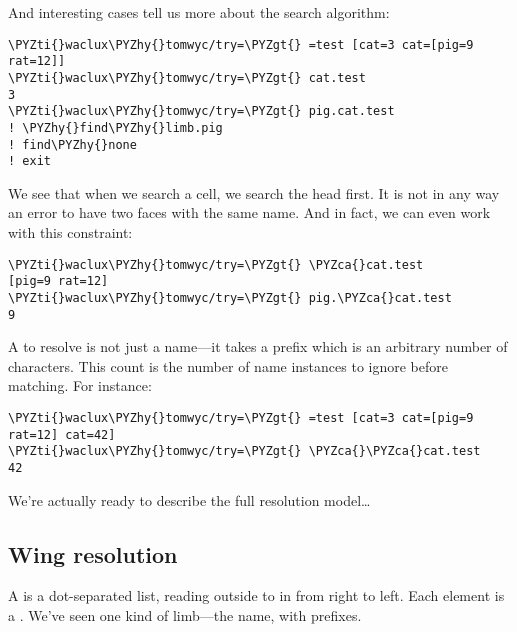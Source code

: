 And interesting cases tell us more about the search algorithm:

\begin{framed_shaded}
\begin{Verbatim}[fontsize=\relsize{-2.5},fontseries=b,commandchars=\\\{\}]
\PYZti{}waclux\PYZhy{}tomwyc/try=\PYZgt{} =test [cat=3 cat=[pig=9 rat=12]]
\PYZti{}waclux\PYZhy{}tomwyc/try=\PYZgt{} cat.test
3
\PYZti{}waclux\PYZhy{}tomwyc/try=\PYZgt{} pig.cat.test
! \PYZhy{}find\PYZhy{}limb.pig
! find\PYZhy{}none
! exit
\end{Verbatim}
\end{framed_shaded}

We see that when we search a cell, we search the head first.  It
is not in any way an error to have two faces with the same name.
And in fact, we can even work with this constraint:

\begin{framed_shaded}
\begin{Verbatim}[fontsize=\relsize{-2.5},fontseries=b,commandchars=\\\{\}]
\PYZti{}waclux\PYZhy{}tomwyc/try=\PYZgt{} \PYZca{}cat.test
[pig=9 rat=12]
\PYZti{}waclux\PYZhy{}tomwyc/try=\PYZgt{} pig.\PYZca{}cat.test
9
\end{Verbatim}
\end{framed_shaded}

A  to resolve is not just a name---it takes a prefix which
is an arbitrary number of \kode{\^{}} characters.  This count is the
number of name instances to ignore before matching.  For
instance:

\begin{framed_shaded}
\begin{Verbatim}[fontsize=\relsize{-2.5},fontseries=b,commandchars=\\\{\}]
\PYZti{}waclux\PYZhy{}tomwyc/try=\PYZgt{} =test [cat=3 cat=[pig=9 rat=12] cat=42]
\PYZti{}waclux\PYZhy{}tomwyc/try=\PYZgt{} \PYZca{}\PYZca{}cat.test
42
\end{Verbatim}
\end{framed_shaded}

We're actually ready to describe the full resolution model\ldots{}

\subsection{Wing resolution}

A  is a dot-separated list, reading outside to in from
right to left.  Each element is a .  We've seen one kind of
limb---the name, with \kode{\^{}} prefixes.


